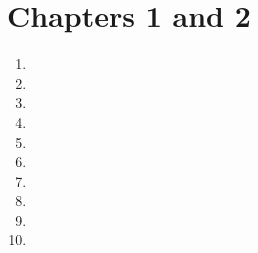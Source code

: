 \section{Chapters 1 and 2}

\begin{enumerate}[label=\textbf{\Alph*.}]
	\setlength{\itemsep}{\bigskipamount}
	\item
		

	\item
		

	\item
		

	\item
		

	\item
		

	\item
		

	\item
		

	\item
		

	\item
		

	\item
		

\end{enumerate}